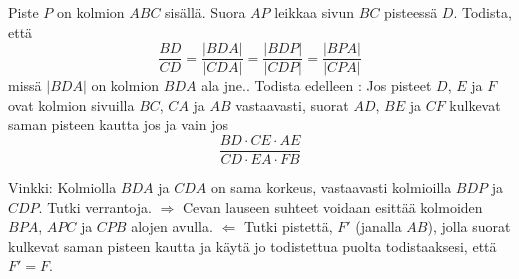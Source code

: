 \begin{tehtavasivu}
\begin{tehtava}
Piste $P$ on kolmion $ABC$ sisällä. Suora $AP$ leikkaa sivun $BC$ pisteessä $D$. Todista, että
\[
\frac{BD}{CD} = \frac{|BDA|}{|CDA|} = \frac{|BDP|}{|CDP|} = \frac{|BPA|}{|CPA|}
\]
missä $|BDA|$ on kolmion $BDA$ ala jne.. Todista edelleen : Jos pisteet $D$, $E$ ja $F$ ovat kolmion sivuilla $BC$, $CA$ ja $AB$ vastaavasti, suorat $AD$, $BE$ ja $CF$ kulkevat saman pisteen kautta jos ja vain jos
\[
\frac{BD\cdot CE \cdot AE}{CD \cdot EA \cdot FB}
\]
\begin{vastaus}
Vinkki: Kolmiolla $BDA$ ja $CDA$ on sama korkeus, vastaavasti kolmioilla $BDP$ ja $CDP$. Tutki verrantoja. $\Rightarrow$ Cevan lauseen suhteet voidaan esittää kolmoiden $BPA$, $APC$ ja $CPB$ alojen avulla. $\Leftarrow$ Tutki pistettä, $F'$ (janalla $AB$), jolla suorat kulkevat saman pisteen kautta ja käytä jo todistettua puolta todistaaksesi, että $F' = F$.
\end{vastaus}
\end{tehtava}
\end{tehtavasivu}

